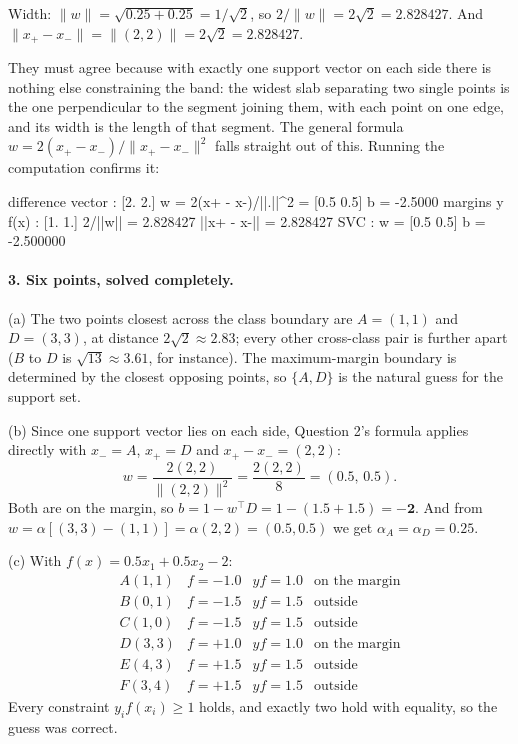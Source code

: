\documentclass[11pt]{article}
\begin{document}
Width: $\|w\| = \sqrt{0.25 + 0.25} = 1/\sqrt2$, so
$2/\|w\| = 2\sqrt2 = \mathbf{2.828427}$. And
$\|x_+ - x_-\| = \|(2,2)\| = 2\sqrt2 = 2.828427$.

They must agree because with exactly one support vector on each side there is
nothing else constraining the band: the widest slab separating two single
points is the one perpendicular to the segment joining them, with each point on
one edge, and its width is the length of that segment. The general formula
$w = 2(x_+ - x_-)/\|x_+ - x_-\|^2$ falls straight out of this. Running the
computation confirms it:

\begin{codeout}
difference vector    : [2. 2.]
w = 2(x+ - x-)/||.||^2 = [0.5 0.5]
b                    = -2.5000
margins y f(x)       : [1. 1.]
2/||w||              = 2.828427
||x+ - x-||          = 2.828427
SVC                  : w = [0.5 0.5]  b = -2.500000
\end{codeout}

\paragraph{3. Six points, solved completely.}
(a) The two points closest across the class boundary are $A = (1,1)$ and
$D = (3,3)$, at distance $2\sqrt2 \approx 2.83$; every other cross-class pair
is further apart ($B$ to $D$ is $\sqrt{13} \approx 3.61$, for instance). The
maximum-margin boundary is determined by the closest opposing points, so
$\{A, D\}$ is the natural guess for the support set.

(b) Since one support vector lies on each side, Question 2's formula applies
directly with $x_- = A$, $x_+ = D$ and $x_+ - x_- = (2,2)$:
\[
  w = \frac{2(2,2)}{\|(2,2)\|^2} = \frac{2(2,2)}{8} = \mathbf{(0.5,\,0.5)} .
\]
Both are on the margin, so $b = 1 - w^\top D = 1 - (1.5 + 1.5) = \mathbf{-2}$.
And from $w = \alpha[(3,3)-(1,1)] = \alpha(2,2) = (0.5,0.5)$ we get
$\alpha_A = \alpha_D = \mathbf{0.25}$.

(c) With $f(x) = 0.5x_1 + 0.5x_2 - 2$:
\[
  \begin{array}{lrrl}
    A(1,1) & f = -1.0 & y f = 1.0 & \text{on the margin}\\
    B(0,1) & f = -1.5 & y f = 1.5 & \text{outside}\\
    C(1,0) & f = -1.5 & y f = 1.5 & \text{outside}\\
    D(3,3) & f = +1.0 & y f = 1.0 & \text{on the margin}\\
    E(4,3) & f = +1.5 & y f = 1.5 & \text{outside}\\
    F(3,4) & f = +1.5 & y f = 1.5 & \text{outside}
  \end{array}
\]
Every constraint $y_i f(x_i) \ge 1$ holds, and exactly two hold with equality,
so the guess was correct.
\end{document}
